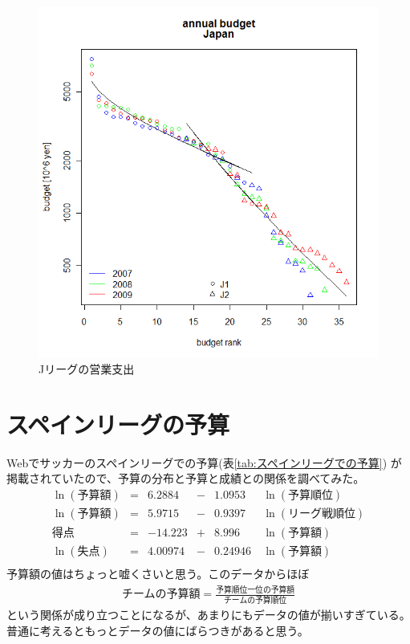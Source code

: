 	\begin{figure}[htbp] %
		\begin{center}
			\includegraphics{fig/japan-budget.png}
		\end{center}
		\caption{Jリーグの営業支出}\label{fig:Jリーグの営業支出}
	\end{figure} %

\section{スペインリーグの予算}\label{s1:スペインリーグの予算} %
	Webでサッカーのスペインリーグでの予算(表\ref{tab:スペインリーグでの予算})
	が掲載されていたので、予算の分布と予算と成績との関係を調べてみた。
	\begin{equation*}\begin{array}{rcrcrl} %
		\ln(\text{予算額}) &=& 6.2884 &-& 1.0953 & \ln(\text{予算順位}) \\
		\ln(\text{予算額}) &=& 5.9715 &-& 0.9397 & \ln(\text{リーグ戦順位}) \\
		\text{得点} &=& -14.223 &+& 8.996 & \ln(\text{予算額}) \\
		\ln(\text{失点}) &=& 4.00974 &-& 0.24946\ & \ln(\text{予算額}) \\
	\end{array}\end{equation*} %
	予算額の値はちょっと嘘くさいと思う。このデータからほぼ
	\begin{equation*}\begin{split} %
		\text{チームの予算額}
			=\frac{\text{予算順位一位の予算額}}{\text{チームの予算順位}}
	\end{split}\end{equation*} %
	という関係が成り立つことになるが、あまりにもデータの値が揃いすぎている。
	普通に考えるともっとデータの値にばらつきがあると思う。

